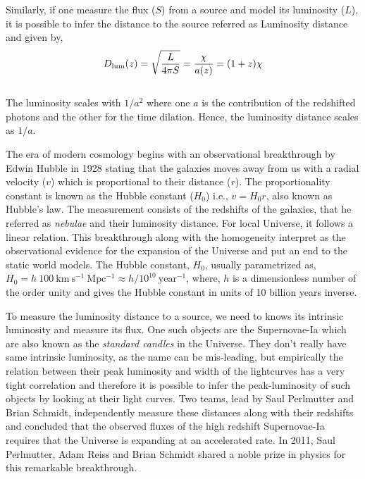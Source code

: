 Similarly, if one measure the flux ($S$) from a source and model its luminosity ($L$), it is
possible to infer the distance to the source referred as Luminosity distance and 
given by,
\begin{equation}
	D_{\rm lum}(z) = \sqrt{\dfrac{L}{4\pi S}} = \dfrac{\chi}{a(z)} = (1+z)\chi
\end{equation}
\\
The luminosity scales with $1/a^2$ where one $a$ is the contribution of the redshifted
photons and the other for the time dilation. Hence, the luminosity distance scales
as $1/a$.

The era of modern cosmology begins with an observational breakthrough by Edwin Hubble 
in 1928 stating that the galaxies moves away from us with a radial velocity ($v$) which
is proportional to their distance ($r$). The proportionality constant is known
as the Hubble constant ($H_0$) i.e., $v=H_0 r$, also known as Hubble's law. 
The measurement consists of the redshifts of the galaxies, that he referred as
{\it nebulae} and their luminosity distance. For local Universe, it follows
a linear relation. 
This breakthrough along with the
homogeneity interpret as the observational evidence for the expansion of the Universe and
put an end to the static world models. The Hubble constant, $H_0$, usually parametrized as, 
$H_0 = h\ 100\ \mathrm{km\ s^{-1}\ Mpc^{-1}} \approx h/10^{10}\ \mathrm{year^{-1}}$,
where, $h$ is a dimensionless number of the order unity and gives the 
Hubble constant in units of 10 billion years inverse. 

To measure the luminosity distance to a source, we need to 
knows its intrinsic luminosity and measure its flux. One such objects are the
Supernovae-Ia which are also known as the {\it standard candles} in the Universe. They
don't really have same intrinsic luminosity, as the name can be mis-leading, but 
empirically the relation between their peak luminosity and width of the lightcurves
has a very tight correlation and therefore it is possible to infer the peak-luminosity
of such objects by looking at their light curves. Two teams, lead by Saul Perlmutter and
Brian Schmidt, independently measure these distances along with their redshifts and
concluded that the observed fluxes of the high redshift Supernovae-Ia requires that
the Universe is expanding at an accelerated rate. In 2011, Saul Perlmutter, Adam Reiss and
Brian Schmidt shared a noble prize in physics for this remarkable breakthrough. 




